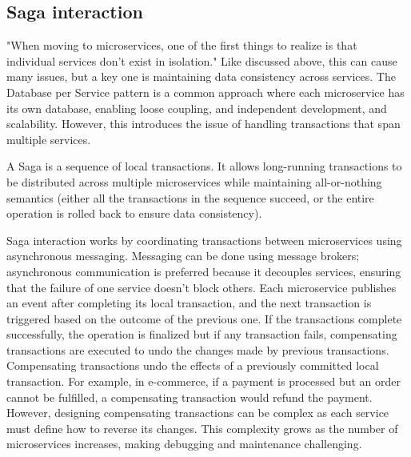 \documentclass[]{final}
\begin{document}
\subsection{Saga interaction}

"When moving to microservices, one of the first things to
realize is that individual services don’t exist in isolation." %
Like discussed above, this can cause many issues, but a key one
is maintaining data
consistency across services. The Database per Service pattern is a common
approach where each microservice has its own database, enabling loose coupling,
and independent development, and scalability. However, this introduces the
issue of handling transactions that span multiple services.

A Saga is a sequence of local transactions. %
It allows long-running transactions to be distributed across multiple
microservices while maintaining all-or-nothing semantics
(either all the transactions in the sequence succeed, or the entire operation
is rolled back to ensure data consistency).

Saga interaction works by coordinating transactions between microservices using
asynchronous messaging.
Messaging can be done using message brokers; asynchronous communication is
preferred because it decouples services, ensuring that the failure of one
service doesn’t block others. %
Each microservice publishes an event after completing its local transaction,
and the next transaction is triggered based on the outcome of the previous
one. If the transactions complete successfully, the operation is finalized
but if any transaction fails, compensating transactions are executed to
undo the changes made by previous transactions. %
Compensating transactions undo the effects of a previously committed local
transaction. For example, in e-commerce, if a payment is processed but an
order cannot be fulfilled, a compensating transaction would refund the
payment. However, designing compensating transactions can be complex as each
service must define how to reverse its changes. This complexity grows as
the number of microservices increases, making debugging and maintenance
challenging.
\end{document}
